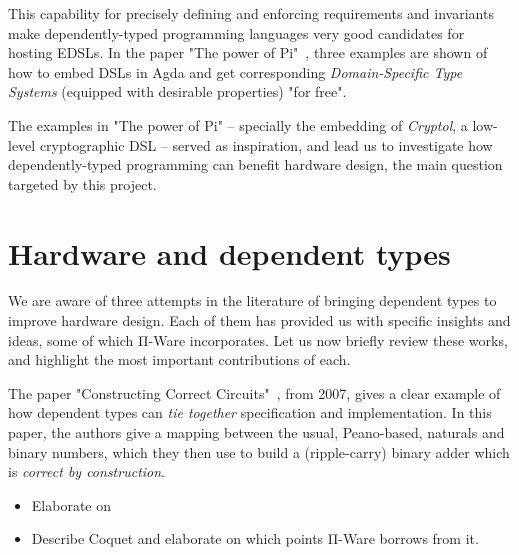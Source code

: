             This capability for precisely defining and enforcing requirements and invariants make
            dependently-typed programming languages very good candidates for hosting \acp{EDSL}.
            In the paper "The power of Pi"~\cite{power-pi}, three examples are shown of how to
            embed \acp{DSL} in Agda and get corresponding \emph{Domain-Specific Type Systems}
            (equipped with desirable properties) "for free".

            The examples in "The power of Pi" -- specially the embedding of \emph{Cryptol},
            a low-level cryptographic \ac{DSL} -- served as inspiration,
            and lead us to investigate how dependently-typed programming can benefit hardware
            design, the main question targeted by this project.



    \section{Hardware and dependent types}
    \label{sec:hardware-dtp}

        We are aware of three attempts in the literature of bringing dependent types to improve hardware design.
        Each of them has provided us with specific insights and ideas, some of which Π-Ware incorporates.
        Let us now briefly review these works, and highlight the most important contributions of each.

        The paper "Constructing Correct Circuits"~\cite{brady-constructing}, from 2007,
        gives a clear example of how dependent types can \emph{tie together} specification and implementation.
        In this paper, the authors give a mapping between the usual, Peano-based, naturals and binary numbers,
        which they then use to build a (ripple-carry) binary adder which is \emph{correct by construction}.

        \begin{itemize}
            \item Elaborate on~\cite{certifying-circuits-cic}
            \item Describe Coquet and elaborate on which points Π-Ware borrows from it.
        \end{itemize}

